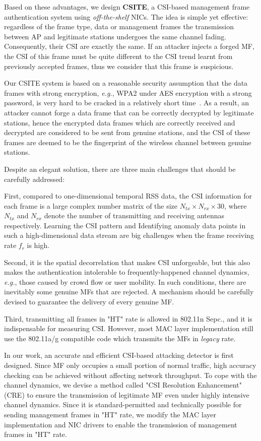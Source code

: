 \documentclass[conference]{IEEEtran}
\def\eg{\textit{e.g.}\xspace}
\begin{document}
Based on these advantages, we design \textbf{CSITE}, a CSI-based management frame
authentication system using \textit{off-the-shelf} NICs.
The idea is simple yet effective: regardless of the frame type, data or management frames
 the transmission between AP and legitimate stations undergoes
 the same channel fading. Consequently, their CSI are exactly the same.
If an attacker injects a forged MF, the CSI of this frame
 must be quite different to the CSI trend learnt from previously
 accepted frames, thus we consider that this frame is suspicious.

Our CSITE system is based on a reasonable security assumption that the
 data frames with strong encryption, \eg, WPA2 under AES encryption
 with a strong password, is very hard to be cracked in a relatively short time~\cite{mitchell2005security}.
As a result, an attacker cannot forge a data
 frame that can be correctly decrypted by legitimate
 stations, hence the encrypted data frames which are correctly received and decrypted are considered to be
 sent from genuine stations, and the CSI of these frames are deemed to be the fingerprint of the wireless channel between genuine stations.

Despite an elegant solution, there are three main challenges that should be
 carefully addressed:

First, compared to one-dimensional temporal RSS data, the CSI information for each frame is a
 large complex number matrix of the size $N_{tx}\times
 N_{rx} \times 30$, where $N_{tx}$ and $N_{rx}$ denote the number of
 transmitting and receiving antennas respectively. Learning the CSI pattern and
Identifying anomaly data points in such a high-dimensional data stream
are big challenges when the frame receiving rate $f_r$ is high.

Second, it is the spatial decorrelation that makes CSI
 unforgeable, but this also makes the authentication intolerable to frequently-happened channel dynamics, \eg, those caused by crowd flow or user mobility.
In such conditions, there are inevitably some genuine MFs that are rejected.
 A mechanism should be carefully devised to
 guarantee the delivery of every genuine MF.

Third, transmitting all frames in "HT" rate is allowed in 802.11n Sepc.,
and it is indispensable for measuring CSI.
However, most MAC layer implementation still use the 802.11a/g compatible code which transmits the MFs in \textit{legacy} rate.

In our work, an accurate and efficient CSI-based attacking detector is first designed. Since MF only occupies a small portion of normal traffic, high accuracy checking can be achieved without affecting network throughput.
To cope with the channel dynamics, we devise a
 method called "CSI Resolution Enhancement" (CRE) to ensure the
 transmission of legitimate MF even under highly intensive channel
 dynamics.
Since it is standard-permitted and technically possible for sending
 management frames in "HT" rate,
 we modify the MAC layer implementation
 and  NIC drivers to enable the transmission of management frames in
 "HT" rate.
\end{document}
